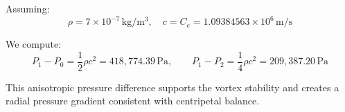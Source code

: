 \documentclass[12pt]{article}
\begin{document}
    \begin{tcolorbox}[colback=gray!10, colframe=black, title=Example: Vortex Pressure Drop]

        Assuming:
        \[
            \rho = 7 \times 10^{-7} \, \mathrm{kg/m^3}, \quad c = C_e = 1.09384563 \times 10^6 \, \mathrm{m/s}
        \]

        We compute:
        \[
            P_1 - P_0 = \frac{1}{2} \rho c^2 = \boxed{418{,}774.39 \, \mathrm{Pa}}, \qquad
            P_1 - P_2 = \frac{1}{4} \rho c^2 = \boxed{209{,}387.20 \, \mathrm{Pa}}
        \]

        This anisotropic pressure difference supports the vortex stability and creates a radial pressure gradient consistent with centripetal balance.
    \end{tcolorbox}


    \ifdefined\standalonechapter
    \else
    
    
    
\end{document}
